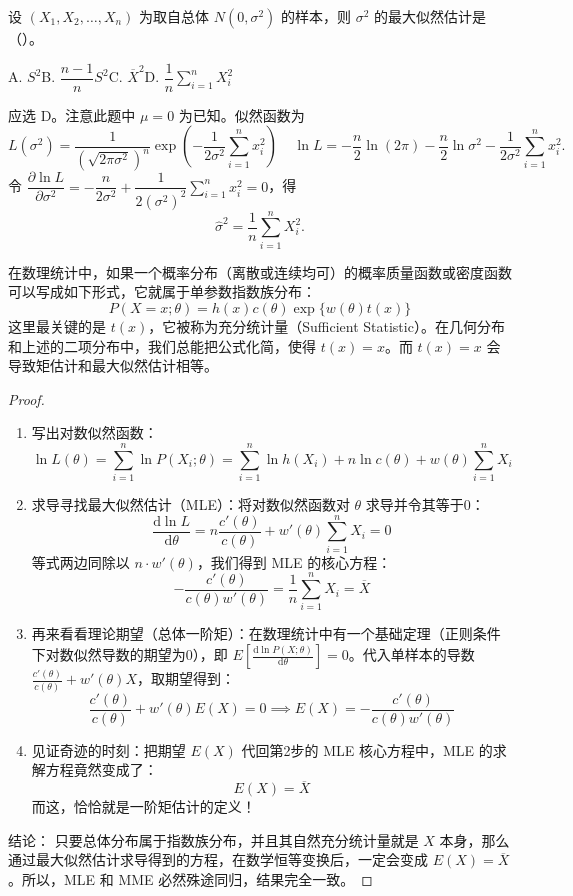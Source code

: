 \documentclass[lang=cn,11pt]{elegantbook}
\begin{document}
\begin{exercise}\label{exer:7-normal-sigma2}
设 \((X_1, X_2, \dots, X_n)\) 为取自总体 \(N(0, \sigma^2)\) 的样本，则 \(\sigma^2\) 的最大似然估计是（\quad）。\par
A. \(S^2\)\qquad B. \(\dfrac{n-1}{n}S^2\)\qquad C. \(\overline{X}^2\)\qquad D. \(\dfrac{1}{n}\displaystyle\sum_{i=1}^{n}X_i^2\)
\end{exercise}
\begin{solution}
应选 D。注意此题中 \(\mu=0\) 为已知。似然函数为
\[
L(\sigma^2) = \frac{1}{(\sqrt{2\pi\sigma^2})^n}\exp\!\left(-\frac{1}{2\sigma^2}\sum_{i=1}^{n}x_i^2\right)~~~~~
\ln L = -\frac{n}{2}\ln(2\pi) - \frac{n}{2}\ln\sigma^2 - \frac{1}{2\sigma^2}\sum_{i=1}^{n}x_i^2.
\]
令 \(\dfrac{\partial\ln L}{\partial\sigma^2} = -\dfrac{n}{2\sigma^2} + \dfrac{1}{2(\sigma^2)^2}\displaystyle\sum_{i=1}^{n}x_i^2 = 0\)，得
\[
\hat{\sigma}^2 = \frac{1}{n}\sum_{i=1}^{n}X_i^2.
\]
\end{solution}


\begin{proposition}\label{prop:mle-mme-equiv} 
    在数理统计中，如果一个概率分布（离散或连续均可）的概率质量函数或密度函数可以写成如下形式，它就属于单参数指数族分布：$$P(X=x; \theta) = h(x)c(\theta)\exp\{w(\theta)t(x)\}$$这里最关键的是 $t(x)$，它被称为充分统计量（Sufficient Statistic）。在几何分布和上述的二项分布中，我们总能把公式化简，使得 $t(x) = x$。而 $t(x)=x$ 会导致矩估计和最大似然估计相等。
\end{proposition}
\begin{proof}
\begin{enumerate}
    \item 写出对数似然函数：$$\ln L(\theta) = \sum_{i=1}^n \ln P(X_i; \theta) = \sum_{i=1}^n \ln h(X_i) + n\ln c(\theta) + w(\theta)\sum_{i=1}^n X_i$$
    \item 求导寻找最大似然估计（MLE）：将对数似然函数对 $\theta$ 求导并令其等于0：$$\frac{\mathrm{d}\ln L}{\mathrm{d}\theta} = n\frac{c'(\theta)}{c(\theta)} + w'(\theta)\sum_{i=1}^n X_i = 0$$等式两边同除以 $n \cdot w'(\theta)$，我们得到 MLE 的核心方程：$$-\frac{c'(\theta)}{c(\theta)w'(\theta)} = \frac{1}{n}\sum_{i=1}^n X_i = \overline{X}$$
    \item 再来看看理论期望（总体一阶矩）：在数理统计中有一个基础定理（正则条件下对数似然导数的期望为0），即 $E\left[ \frac{\mathrm{d}\ln P(X; \theta)}{\mathrm{d}\theta} \right] = 0$。代入单样本的导数 $\frac{c'(\theta)}{c(\theta)} + w'(\theta)X$，取期望得到：$$\frac{c'(\theta)}{c(\theta)} + w'(\theta)E(X) = 0 \implies E(X) = -\frac{c'(\theta)}{c(\theta)w'(\theta)}$$
    \item 见证奇迹的时刻：把期望 $E(X)$ 代回第2步的 MLE 核心方程中，MLE 的求解方程竟然变成了：$$E(X) = \overline{X}$$而这，恰恰就是一阶矩估计的定义！
\end{enumerate}
结论： 只要总体分布属于指数族分布，并且其自然充分统计量就是 $X$ 本身，那么通过最大似然估计求导得到的方程，在数学恒等变换后，一定会变成 $E(X) = \overline{X}$。所以，MLE 和 MME 必然殊途同归，结果完全一致。
\end{proof}
\end{document}
